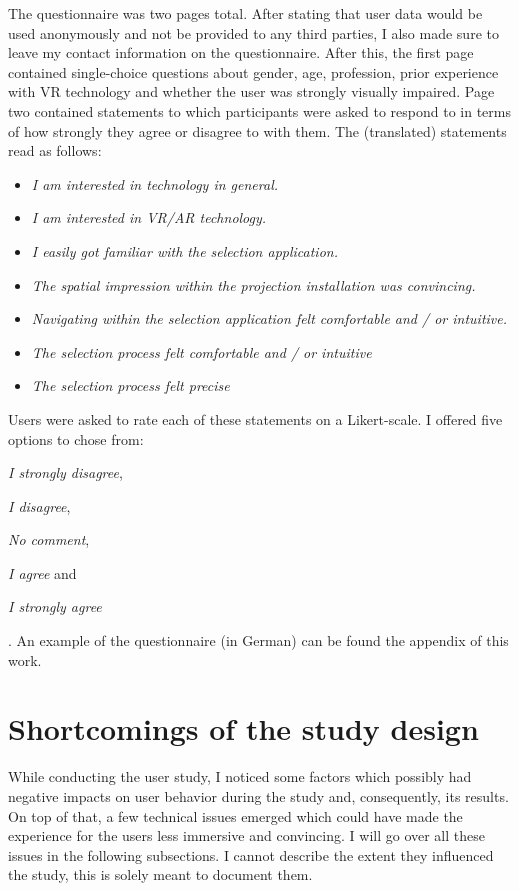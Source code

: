 The questionnaire was two pages total. After stating that user data would be used anonymously and not be provided to any third parties, I also made sure to leave my contact information on the questionnaire. After this, the first page contained single-choice questions about gender, age, profession, prior experience with VR technology and whether the user was strongly visually impaired. Page two contained statements to which participants were asked to respond to in terms of how strongly they agree or disagree to with them. The (translated) statements read as follows:

\begin{itemize}
	\item \textit{I am interested in technology in general.}
	\item \textit{I am interested in VR/AR technology.}
	\item \textit{I easily got familiar with the selection application.}
	\item \textit{The spatial impression within the projection installation was convincing.}
	\item \textit{Navigating within the selection application felt comfortable and / or intuitive.}
	\item \textit{The selection process felt comfortable and / or intuitive}
	\item \textit{The selection process felt precise}
\end{itemize}

Users were asked to rate each of these statements on a Likert-scale. I offered five options to chose from:
\begin{enumerate*}
	\item \textit{I strongly disagree},
	\item \textit{I disagree},
	\item \textit{No comment},
	\item \textit{I agree} and
	\item \textit{I strongly agree}
\end{enumerate*}.
An example of the questionnaire (in German) can be found the appendix of this work.

	\section{Shortcomings of the study design}
	\label{sec:shortcomings_of_the_study_design}
While conducting the user study, I noticed some factors which possibly had negative impacts on user behavior during the study and, consequently, its results. On top of that, a few technical issues emerged which could have made the experience for the users less immersive and convincing. I will go over all these issues in the following subsections. I cannot describe the extent they influenced the study, this is solely meant to document them.

